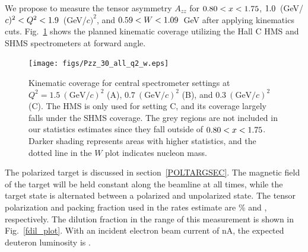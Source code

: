 




\label{EXP}
We propose to measure the tensor asymmetry $A_{zz}$ for $0.80<x<1.75$, $1.0$~(GeV/$c)^2 < Q^2 <1.9$~(GeV/$c)^2$, and $0.59 < W < 1.09$~GeV after applying kinematics cuts. Fig.~\ref{kincov} shows the planned kinematic coverage utilizing the Hall C HMS and SHMS spectrometers at forward angle.

\begin{figure}
\begin{center}
\texttt{[image: figs/Pzz\_30\_all\_q2\_w.eps]}

\caption{\label{kincov} Kinematic coverage for central spectrometer settings at $Q^2=1.5~(\mathrm{GeV}/c)^2$ (A), $0.7~(\mathrm{GeV}/c)^2$ (B), and $0.3~(\mathrm{GeV}/c)^2$ (C).  The HMS is only used for setting C, and its coverage largely falls under the SHMS coverage. The grey regions are not included in our statistics estimates since they fall outside of $0.80 < x < 1.75$. Darker shading represents areas with higher statistics, and the dotted line in the $W$ plot indicates nucleon mass. }
\end{center}
\end{figure}


The polarized \TARGET target is discussed in section~\ref{POLTARGSEC}.  The magnetic field of the target will be held constant along the beamline at all times, while the target state is alternated between a polarized and unpolarized state.
The tensor polarization and packing fraction used in the rates estimate are \PZZ\% and \PF, respectively. 
The dilution fraction in the range of this measurement is shown in Fig.~\ref{fdil_plot}.
With an incident electron beam current of \CURRENT nA, the expected deuteron luminosity is \LUMI.

